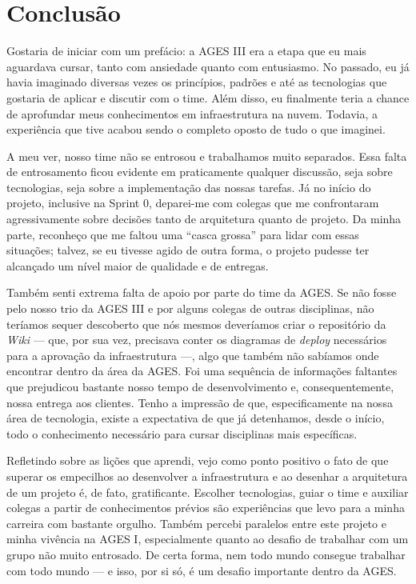 \section[Conclusão]{Conclusão}

Gostaria de iniciar com um prefácio: a AGES III era a etapa que eu mais aguardava cursar, tanto com ansiedade quanto com entusiasmo. No passado, eu já havia imaginado diversas vezes os princípios, padrões e até as tecnologias que gostaria de aplicar e discutir com o time. Além disso, eu finalmente teria a chance de aprofundar meus conhecimentos em infraestrutura na nuvem. Todavia, a experiência que tive acabou sendo o completo oposto de tudo o que imaginei.

A meu ver, nosso time não se entrosou e trabalhamos muito separados. Essa falta de entrosamento ficou evidente em praticamente qualquer discussão, seja sobre tecnologias, seja sobre a implementação das nossas tarefas. Já no início do projeto, inclusive na Sprint 0, deparei-me com colegas que me confrontaram agressivamente sobre decisões tanto de arquitetura quanto de projeto. Da minha parte, reconheço que me faltou uma “casca grossa” para lidar com essas situações; talvez, se eu tivesse agido de outra forma, o projeto pudesse ter alcançado um nível maior de qualidade e de entregas.

Também senti extrema falta de apoio por parte do time da AGES. Se não fosse pelo nosso trio da AGES III e por alguns colegas de outras disciplinas, não teríamos sequer descoberto que nós mesmos deveríamos criar o repositório da \textit{Wiki} — que, por sua vez, precisava conter os diagramas de \textit{deploy} necessários para a aprovação da infraestrutura —, algo que também não sabíamos onde encontrar dentro da área da AGES. Foi uma sequência de informações faltantes que prejudicou bastante nosso tempo de desenvolvimento e, consequentemente, nossa entrega aos clientes. Tenho a impressão de que, especificamente na nossa área de tecnologia, existe a expectativa de que já detenhamos, desde o início, todo o conhecimento necessário para cursar disciplinas mais específicas.

Refletindo sobre as lições que aprendi, vejo como ponto positivo o fato de que superar os empecilhos ao desenvolver a infraestrutura e ao desenhar a arquitetura de um projeto é, de fato, gratificante. Escolher tecnologias, guiar o time e auxiliar colegas a partir de conhecimentos prévios são experiências que levo para a minha carreira com bastante orgulho. Também percebi paralelos entre este projeto e minha vivência na AGES I, especialmente quanto ao desafio de trabalhar com um grupo não muito entrosado. De certa forma, nem todo mundo consegue trabalhar com todo mundo — e isso, por si só, é um desafio importante dentro da AGES.
